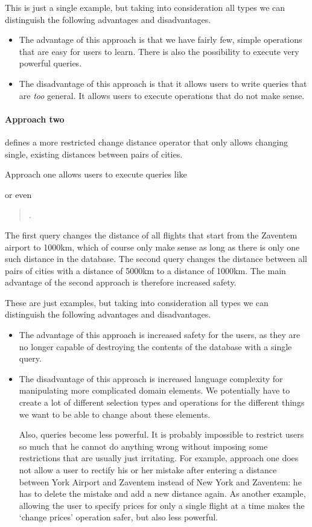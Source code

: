 This is just a single example, but taking into consideration all types we can
distinguish the following advantages and disadvantages.
\begin{itemize}
  \item The advantage of this approach is that we have fairly few, simple
    operations that are easy for users to learn. There is also the possibility
    to execute very powerful queries.
  \item The disadvantage of this approach is that it allows users to write
    queries that are \emph{too} general. It allows users to execute
    operations that do not make sense.
\end{itemize}

\paragraph{Approach two}
defines a more restricted change distance operator that only allows changing
single, existing distances between pairs of cities.

Approach one allows users to execute queries like
\begin{quote}
\end{quote}
or even
\begin{quote}
  .
\end{quote}
The first query changes the distance of all flights that start from the Zaventem
airport to 1000km, which of course only make sense as long as there is only one
such distance in the database. The second query changes the distance between all
pairs of cities with a distance of 5000km to a distance of 1000km. The main
advantage of the second approach is therefore increased safety.

These are just examples, but taking into consideration all types we can
distinguish the following advantages and disadvantages.
\begin{itemize}
  \item The advantage of this approach is increased safety for the users, as
    they are no longer capable of destroying the contents of the database with a
    single query.
  \item The disadvantage of this approach is increased language complexity
    for manipulating more complicated domain elements. We potentially
    have to create a lot of different selection types and operations for the
    different things we want to be able to change about these elements.

    Also, queries become less powerful. It is probably impossible to restrict
    users so much that he cannot do anything wrong without imposing some
    restrictions that are usually just irritating. For example, approach one
    does not allow a user to rectify his or her mistake after entering a distance
    between York Airport and Zaventem instead of New York and Zaventem: he has
    to delete the mistake and add a new distance again. As another example,
    allowing the user to specify prices for only a single flight at a time makes
    the ‘change prices’ operation safer, but also less powerful.
\end{itemize}

